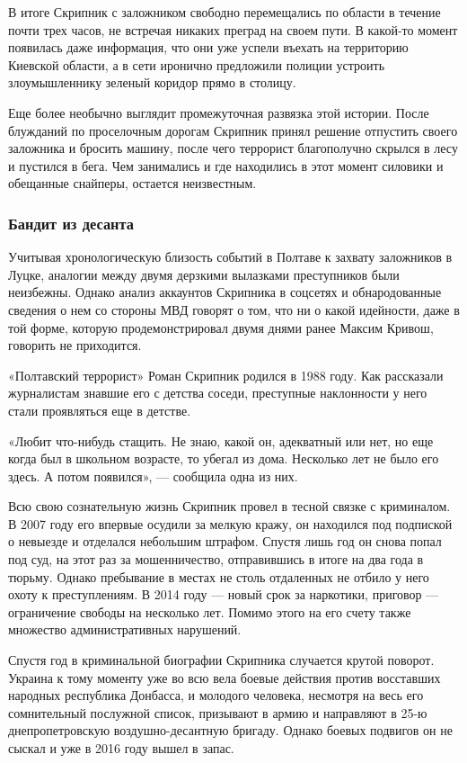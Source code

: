 \documentclass[a4paper,11pt]{extreport}
\begin{document}
В итоге Скрипник с заложником свободно перемещались по области в течение почти
трех часов, не встречая никаких преград на своем пути. В какой-то момент
появилась даже информация, что они уже успели въехать на территорию Киевской
области, а в сети иронично предложили полиции устроить злоумышленнику зеленый
коридор прямо в столицу.

Еще более необычно выглядит промежуточная развязка этой истории. После
блужданий по проселочным дорогам Скрипник принял решение отпустить своего
заложника и бросить машину, после чего террорист благополучно скрылся в лесу и
пустился в бега. Чем занимались и где находились в этот момент силовики и
обещанные снайперы, остается неизвестным. 

\subsubsection{Бандит из десанта}

Учитывая хронологическую близость событий в Полтаве к захвату заложников в
Луцке, аналогии между двумя дерзкими вылазками преступников были неизбежны.
Однако анализ аккаунтов Скрипника в соцсетях и обнародованные сведения о нем со
стороны МВД говорят о том, что ни о какой идейности, даже в той форме, которую
продемонстрировал двумя днями ранее Максим Кривош, говорить не приходится.

«Полтавский террорист» Роман Скрипник родился в 1988 году. Как рассказали
журналистам знавшие его с детства соседи, преступные наклонности у него стали
проявляться еще в детстве.

«Любит что-нибудь стащить. Не знаю, какой он, адекватный или нет, но еще когда
был в школьном возрасте, то убегал из дома. Несколько лет не было его здесь. А
потом появился», --- сообщила одна из них.

Всю свою сознательную жизнь Скрипник провел в тесной связке с криминалом. В
2007 году его впервые осудили за мелкую кражу, он находился под подпиской о
невыезде и отделался небольшим штрафом. Спустя лишь год он снова попал под суд,
на этот раз за мошенничество, отправившись в итоге на два года в тюрьму. Однако
пребывание в местах не столь отдаленных не отбило у него охоту к преступлениям.
В 2014 году --- новый срок за наркотики, приговор --- ограничение свободы на
несколько лет. Помимо этого на его счету также множество административных
нарушений.

Спустя год в криминальной биографии Скрипника случается крутой поворот. Украина
к тому моменту уже во всю вела боевые действия против восставших народных
республика Донбасса, и молодого человека, несмотря на весь его сомнительный
послужной список, призывают в армию и направляют в 25-ю днепропетровскую
воздушно-десантную бригаду. Однако боевых подвигов он не сыскал и уже в 2016
году вышел в запас.
\end{document}
